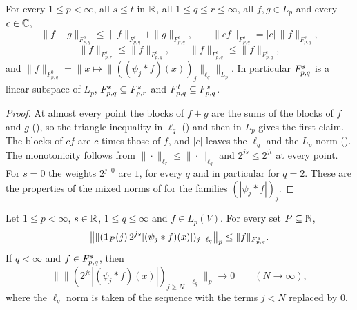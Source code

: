 \begin{proposition}
\label{prop:tl-elementary}
\leanok
{}
For every $1 \leq p < \infty$, all $s \leq t$ in $\mathbb{R}$, all $1 \leq q \leq r \leq \infty$, all
$f, g \in L_p$ and every $c \in \mathbb{C}$,
\[
  \|f + g\|_{F^s_{p,q}} \leq \|f\|_{F^s_{p,q}} + \|g\|_{F^s_{p,q}}, \qquad
  \|c f\|_{F^s_{p,q}} = |c| \, \|f\|_{F^s_{p,q}},
\]
\[
  \|f\|_{F^s_{p,r}} \leq \|f\|_{F^s_{p,q}}, \qquad \|f\|_{F^s_{p,q}} \leq \|f\|_{F^t_{p,q}} ,
\]
and $\|f\|_{F^0_{p,q}} = \bigl\| x \mapsto \|((\psi_j * f)(x))_j\|_{\ell_q} \bigr\|_{L_p}$.
In particular $F^{s}_{p,q}$ is a linear subspace of $L_p$,
$F^{s}_{p,q} \subseteq F^{s}_{p,r}$ and $F^{t}_{p,q} \subseteq F^{s}_{p,q}$.
\end{proposition}

\begin{proof}
\leanok
At almost every point the blocks of $f + g$ are the sums of the blocks of $f$ and $g$
(), so the triangle inequality in $\ell_q$
() and then in $L_p$ gives the first claim. The blocks of $c f$ are $c$ times
those of $f$, and $|c|$ leaves the $\ell_q$ and the $L_p$ norm
(). The monotonicity follows from
$\|\cdot\|_{\ell_r} \leq \|\cdot\|_{\ell_q}$ and $2^{js} \leq 2^{jt}$ at every point. For
$s = 0$ the weights $2^{j \cdot 0}$ are $1$, for every $q$ and in particular for $q = 2$. These
are the properties of the mixed norms of  for the families
$(|\psi_j * f|)_j$.
\end{proof}

\begin{lemma}
\label{lem:weighted-block-tails}
\leanok
{}
Let $1 \leq p < \infty$, $s \in \mathbb{R}$, $1 \leq q \leq \infty$ and $f \in L_p(V)$. For every set
$P \subseteq \mathbb{N}$,
\[
  \bigl\| \|(\mathbf 1_P(j) \, 2^{js} |(\psi_j * f)(x)|)_j\|_{\ell_q} \bigr\|_p
  \leq \|f\|_{F^{s}_{p,q}} .
\]
If $q < \infty$ and $f \in F^{s}_{p,q}$, then
\[
  \bigl\| \|(2^{js} |(\psi_j * f)(x)|)_{j \geq N}\|_{\ell_q} \bigr\|_p \to 0 \qquad
  (N \to \infty) ,
\]
where the $\ell_q$ norm is taken of the sequence with the terms $j < N$ replaced by $0$.
\end{lemma}

